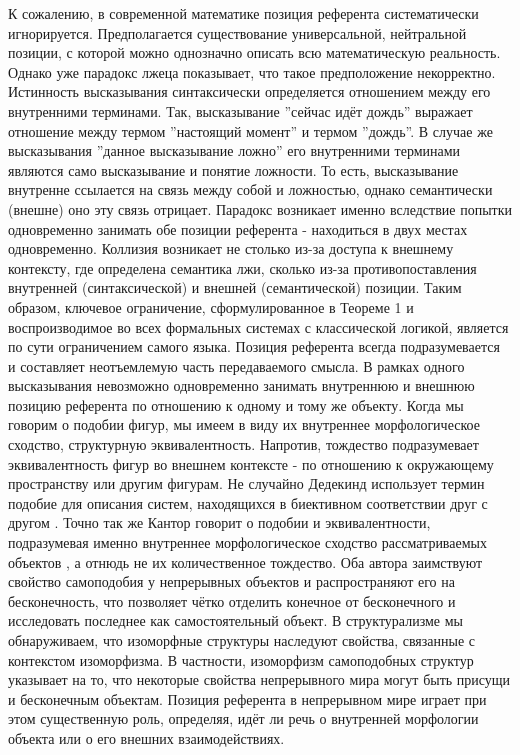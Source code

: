 \documentclass[12pt]{article}
\begin{document}
К сожалению, в современной математике позиция референта систематически игнорируется. Предполагается существование универсальной, нейтральной позиции, с которой можно однозначно описать всю математическую реальность. Однако уже парадокс лжеца показывает, что такое предположение некорректно. Истинность высказывания синтаксически определяется отношением между его внутренними терминами. Так, высказывание ''сейчас идёт дождь'' выражает отношение между термом ''настоящий момент'' и термом ''дождь''. В случае же высказывания ''данное высказывание ложно'' его внутренними терминами являются само высказывание и понятие ложности. То есть, высказывание внутренне ссылается на связь между собой и ложностью, однако семантически (внешне) оно эту связь отрицает. Парадокс возникает именно вследствие попытки одновременно занимать обе позиции референта - находиться в двух местах одновременно. Коллизия возникает не столько из-за доступа к внешнему контексту, где определена семантика лжи, сколько из-за противопоставления внутренней (синтаксической) и внешней (семантической) позиции. Таким образом, ключевое ограничение, сформулированное в Теореме 1 и воспроизводимое во всех формальных системах с классической логикой, является по сути ограничением самого языка. Позиция референта всегда подразумевается и составляет неотъемлемую часть передаваемого смысла. В рамках одного высказывания невозможно одновременно занимать внутреннюю и внешнюю позицию референта по отношению к одному и тому же объекту. Когда мы говорим о подобии фигур, мы имеем в виду их внутреннее морфологическое сходство, структурную эквивалентность. Напротив, тождество подразумевает эквивалентность фигур во внешнем контексте - по отношению к окружающему пространству или другим фигурам. Не случайно Дедекинд использует термин подобие для описания систем, находящихся в биективном соответствии друг с другом \cite{dedekind-infinity}. Точно так же Кантор говорит о подобии и эквивалентности, подразумевая именно внутреннее морфологическое сходство рассматриваемых объектов \cite{cantor-similarity}, а отнюдь не их количественное тождество. Оба автора заимствуют свойство самоподобия у непрерывных объектов и распространяют его на бесконечность, что позволяет чётко отделить конечное от бесконечного и исследовать последнее как самостоятельный объект. В структурализме мы обнаруживаем, что изоморфные структуры наследуют свойства, связанные с контекстом изоморфизма. В частности, изоморфизм самоподобных структур указывает на то, что некоторые свойства непрерывного мира могут быть присущи и бесконечным объектам. Позиция референта в непрерывном мире играет при этом существенную роль, определяя, идёт ли речь о внутренней морфологии объекта или о его внешних взаимодействиях.
\end{document}
